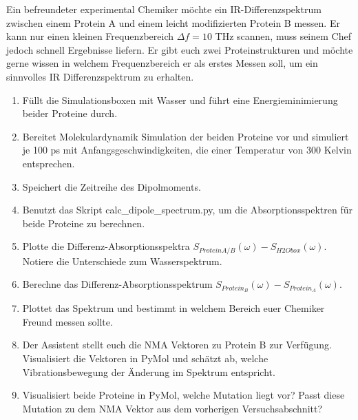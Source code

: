 \documentclass[a4paper,12pt]{article}
\begin{document}
Ein befreundeter experimental Chemiker möchte ein IR-Differenzspektrum zwischen einem Protein A und einem leicht modifizierten Protein B messen. Er
kann nur einen kleinen Frequenzbereich $\Delta f=10$ THz scannen, muss seinem Chef jedoch schnell Ergebnisse liefern. Er gibt euch zwei Proteinstrukturen und möchte 
gerne wissen in welchem Frequenzbereich er als erstes Messen soll, um ein sinnvolles IR Differenzspektrum zu erhalten.
\begin{enumerate}
 \item Füllt die Simulationsboxen mit Wasser und führt eine Energieminimierung beider Proteine durch.
 \item Bereitet Molekulardynamik Simulation der beiden Proteine vor und simuliert je 100 ps mit Anfangsgeschwindigkeiten, die einer Temperatur von 300 Kelvin entsprechen.
 \item Speichert die Zeitreihe des Dipolmoments. 
 \item Benutzt das Skript calc\_dipole\_spectrum.py, um die Absorptionsspektren für beide Proteine zu berechnen.
 \item Plotte die Differenz-Absorptionsspektra $S_{ProteinA/B}(\omega)-S_{H2Obox}(\omega)$. Notiere die Unterschiede zum Wasserspektrum.
 \item Berechne das Differenz-Absorptionsspektrum $S_{Protein_B}(\omega)-S_{Protein_A}(\omega)$. 
 \item Plottet das Spektrum und bestimmt in welchem Bereich euer Chemiker Freund messen sollte.
 \item Der Assistent stellt euch die NMA Vektoren zu Protein B zur Verfügung. Visualisiert die Vektoren in PyMol und schätzt ab, welche Vibrationsbewegung der Änderung im Spektrum entspricht.
 \item Visualisiert beide Proteine in PyMol, welche Mutation liegt vor? Passt diese Mutation zu dem NMA Vektor aus dem vorherigen Versuchsabschnitt?
\end{enumerate}


\pagebreak
\end{document}
